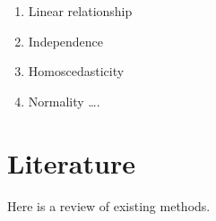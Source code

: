 \documentclass[
]{book}
\providecommand{\tightlist}{%
  \setlength{\itemsep}{0pt}\setlength{\parskip}{0pt}}
\begin{document}
\begin{enumerate}
\def\labelenumi{\arabic{enumi}.}
\tightlist
\item
  Linear relationship
\item
  Independence
\item
  Homoscedasticity
\item
  Normality
  \ldots.
\end{enumerate}

\hypertarget{literature}{%
\chapter{Literature}\label{literature}}

Here is a review of existing methods.

  
\end{document}
